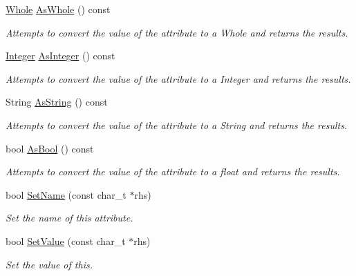 \begin{DoxyCompactItemize}
\hyperlink{namespacephys_a460f6bc24c8dd347b05e0366ae34f34a}{Whole} \hyperlink{classphys_1_1xml_1_1Attribute_ac40df65f4914609554d99e72624eb8d2}{AsWhole} () const 
\begin{DoxyCompactList}\small\item\em Attempts to convert the value of the attribute to a Whole and returns the results. \item\end{DoxyCompactList}\item 
\hyperlink{namespacephys_a7f09bf5585b2bb97613cd9aad4273a81}{Integer} \hyperlink{classphys_1_1xml_1_1Attribute_a6f7ae9a3fe3ad8d88823d97e8fa04973}{AsInteger} () const 
\begin{DoxyCompactList}\small\item\em Attempts to convert the value of the attribute to a Integer and returns the results. \item\end{DoxyCompactList}\item 
String \hyperlink{classphys_1_1xml_1_1Attribute_a7b6b2e3e8c8f262dfca1b97d904c638a}{AsString} () const 
\begin{DoxyCompactList}\small\item\em Attempts to convert the value of the attribute to a String and returns the results. \item\end{DoxyCompactList}\item 
bool \hyperlink{classphys_1_1xml_1_1Attribute_a1c3e0f3a1722aac6a43daa135fdf622e}{AsBool} () const 
\begin{DoxyCompactList}\small\item\em Attempts to convert the value of the attribute to a float and returns the results. \item\end{DoxyCompactList}\item 
bool \hyperlink{classphys_1_1xml_1_1Attribute_af669654308122897f98858563375bf4c}{SetName} (const char\_\-t $\ast$rhs)
\begin{DoxyCompactList}\small\item\em Set the name of this attribute. \item\end{DoxyCompactList}\item 
bool \hyperlink{classphys_1_1xml_1_1Attribute_a470512fcd8b4f7609319bf85df100aaa}{SetValue} (const char\_\-t $\ast$rhs)
\begin{DoxyCompactList}\small\item\em Set the value of this. \item\end{DoxyCompactList}\item 

\end{DoxyCompactItemize}
